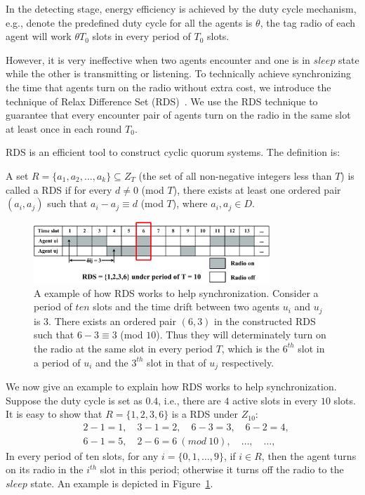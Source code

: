 In the detecting stage,  
energy efficiency is achieved by the duty cycle mechanism, 
e.g., denote the predefined duty cycle for 
all the agents is $\theta$, the tag radio of each agent will work
$\theta T_0$ slots in every period of $T_0$ slots. 

However, it is very ineffective
when two agents encounter and one is in $sleep$ state while the other is transmitting
or listening. 
To technically achieve synchronizing the time that agents turn on the radio without extra cost,
we introduce the technique of Relax Difference Set (RDS)~\cite{luk1997two}.
We use the RDS technique to guarantee that every encounter pair 
of agents turn on the radio in the same slot at least once in each round $T_0$.

RDS is an efficient tool to construct cyclic quorum systems. 
The definition is:
\begin{definition}
A set $R=\{a_1,a_2,...,a_k\} \subseteq Z_T$ (the set of all non-negative integers less than $T$)
is called a RDS if for every $d \neq 0$ (mod $T$),
there exists at least one ordered pair $(a_i,a_j)$ such that $a_i - a_j \equiv d$ (mod $T$), 
where $a_i,a_j \in D$.
\end{definition}

\begin{figure}[h]
    \centering
    \includegraphics[width=3.5in]{figures/RDS}
    \caption{A example of how RDS works to help synchronization. Consider a period
    of $ten$ slots and the time drift between two agents $u_i$ and 
    $u_j$ is $3$. There exists an ordered pair $(6,3)$ in the constructed RDS such that $6 - 3 \equiv 3$ (mod $10$). Thus 
    they will determinately turn on the radio at the same slot in every period $T$, 
    which is the $6^{th}$ slot in a period of $u_i$ and the $3^{th}$ slot in that of $u_j$ respectively.}
    \label{exampleRDS}
\end{figure}

We now give an example to explain how RDS works to help synchronization.
Suppose the duty cycle is set as $0.4$, i.e., there are $4$ active slots 
in every $10$ slots. It is easy to show that $R=\{1,2,3,6\}$ is a RDS
under $Z_{10}$:
\begin{align*}
    &2 - 1 = 1,\quad 3 - 1 = 2,\quad 6 - 3 = 3,\quad 6 - 2 = 4, \\
    &6 - 1 = 5,\quad {2 - 6 = 6}~{(mod~10)},\quad \dots,\quad \dots, 
\end{align*}
In every period of ten slots, for any $i = \{0,1,\dots,9\}$, if $i \in R$, then
the agent turns on its radio in the $i^{th}$ slot in this period; otherwise it turns off the 
radio to the $sleep$ state. An example is depicted in Figure~\ref{exampleRDS}. 



